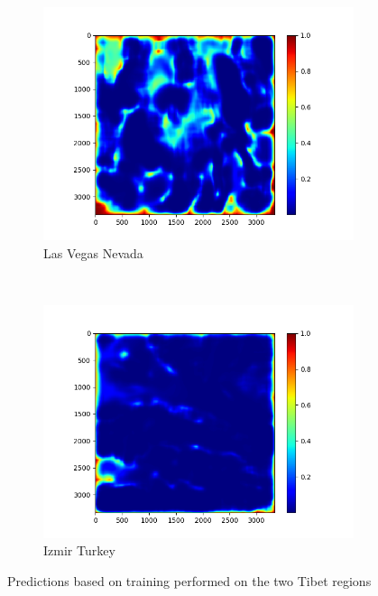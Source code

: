 \documentclass[11pt,a4paper]{article}
\begin{document}
\begin{figure}[t]
    \begin{subfigure}[b]{0.45\textwidth}
        \includegraphics[width=\textwidth]{graphics/training/train_on_01_features_01234/heatmaps_faults_4.png}
        \caption{Las Vegas Nevada}
        \label{fig:heatmaps_2_Las_Vegas_Nevada}
    \end{subfigure}
    ~
    \begin{subfigure}[b]{0.45\textwidth}
        \includegraphics[width=\textwidth]{graphics/training/train_on_01_features_01234/heatmaps_faults_5.png}
        \caption{Izmir Turkey}
        \label{fig:heatmaps_2_Izmir_Turkey}
    \end{subfigure}

    \caption{Predictions based on training performed on the two Tibet regions}
    \label{fig:train_on_01_features_01234_no_additional_im}
\end{figure}
\end{document}
